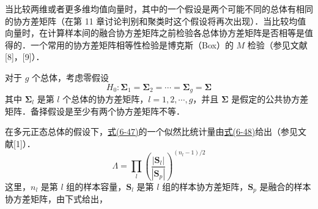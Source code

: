 当比较两维或者更多维均值向量时，其中的一个假设是两个可能不同的总体有相同的协方差矩阵（在第 11 章讨论判别和聚类时这个假设将再次出现）．当比较均值向量时，在计算样本间的融合协方差矩阵之前检验各总体协方差矩阵是否相等是值得的．一个常用的协方差矩阵相等性检验是博克斯（Box）的 $M$ 检验（参见文献[8]，[9]）．

对于 $g$ 个总体，考虑零假设
\label{eq:6-47}
\begin{equation}
H_0:\boldsymbol{\Sigma}_1=\boldsymbol{\Sigma}_2=\cdots=\boldsymbol{\Sigma}_g=\boldsymbol{\Sigma} \tag{6-47}
\end{equation}
其中 $\boldsymbol{\Sigma}_l$ 是第 $l$ 个总体的协方差矩阵，$l=1,2,\cdots,g$，并且 $\boldsymbol{\Sigma}$ 是假定的公共协方差矩阵．备择假设是至少有两个协方差矩阵不等．

在多元正态总体的假设下，\hyperref[eq:6-47]{式(6-47)}的一个似然比统计量由\hyperref[eq:6-48]{式(6-48)}给出（参见文献[1]）．
\label{eq:6-48}
\begin{equation}
\Lambda=\prod_{l}\left(\frac{|\mathbf{S}_l|}{|\mathbf{S}_p|}\right)^{(n_l-1)/2} \tag{6-48}
\end{equation}
这里，$n_l$ 是第 $l$ 组的样本容量，$\mathbf{S}_l$ 是第 $l$ 组的样本协方差矩阵，$\mathbf{S}_p$ 是融合的样本协方差矩阵，由下式给出，
